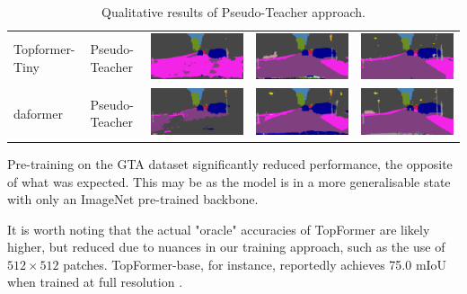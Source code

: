 \documentclass[a4paper,12pt]{report}
\begin{document}
\begin{table}[]
{\begin{tabular}{lllll}
            Topformer-Tiny & Pseudo-Teacher    & \includegraphics[width=.2\linewidth,valign=m]{res/pseudo-teacher-qualitative/topformer-tiny-sourceonly.png} & \includegraphics[width=.2\linewidth,valign=m]{res/pseudo-teacher-qualitative/topformer-tiny-pseudo-teacher.png} & \includegraphics[width=.2\linewidth,valign=m]{res/pseudo-teacher-qualitative/topformer-tiny-oracle.png} \\
            daformer       & Pseudo-Teacher    & \includegraphics[width=.2\linewidth,valign=m]{res/pseudo-teacher-qualitative/daformer-sourceonly.png}       & \includegraphics[width=.2\linewidth,valign=m]{res/pseudo-teacher-qualitative/daformer-uda.png}                  & \includegraphics[width=.2\linewidth,valign=m]{res/pseudo-teacher-qualitative/daformer-oracle.png}       \\
        \end{tabular}
    }
    \caption{Qualitative results of Pseudo-Teacher approach.}
    \label{fig:pseudo-teacher-qualitative}
\end{table}

Pre-training on the GTA dataset significantly reduced performance, the opposite of what was expected. This may be as the model is in a more generalisable state with only an ImageNet pre-trained backbone.

It is worth noting that the actual "oracle" accuracies of TopFormer are likely higher, but reduced due to nuances in our training approach, such as the use of $512 \times 512$ patches. TopFormer-base, for instance, reportedly achieves 75.0 mIoU when trained at full resolution \cite{zhang_topformer_2022}.
\end{document}
